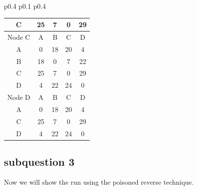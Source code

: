 \documentclass{article}
\begin{document}
\begin{tabular}{p{0.4\linewidth} p{0.1\linewidth} p{0.4\linewidth}}
\begin{tabular}{c|c|c|c|c}
    C & 25 & 7 & 0 & 29 \\
    \hline
    \hline
    Node C & A & B & C & D \\
    \hline
    A & 0 & 18 & 20 & 4 \\
    B & 18 & 0 & 7 & 22 \\
    C & 25 & 7 & 0 & 29 \\
    D & 4 & 22 & 24 & 0 \\
    \hline
    \hline
    Node D & A & B & C & D \\
    \hline
    A & 0 & 18 & 20 & 4 \\
    C & 25 & 7 & 0 & 29 \\
    D & 4 & 22 & 24 & 0 \\
    \hline
\end{tabular}
\end{tabular}

\subsection{subquestion 3}
Now we will show the run using the poisoned reverse technique.\\
\end{document}

